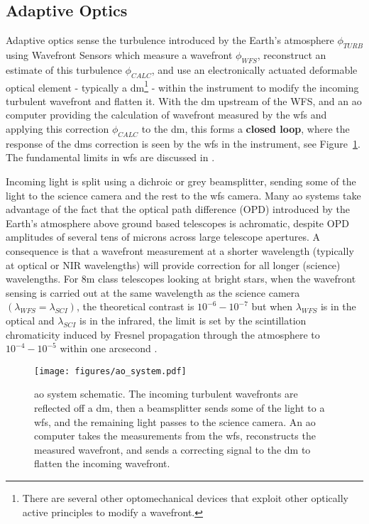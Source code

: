 \documentclass[letterpaper]{ar-1col}
\newcommand{\acc}[1]{\entry{\acs{#1}}{\acl{#1}}}
\begin{document}
\subsection{Adaptive Optics}

Adaptive optics sense the turbulence introduced by the Earth's atmosphere $\phi_{TURB}$ using Wavefront Sensors which measure a wavefront $\phi_{WFS}$, reconstruct an estimate of this turbulence $\phi_{CALC}$, and use an electronically actuated deformable optical element - typically a \ac{dm}\footnote{There are several other optomechanical devices that exploit other optically active principles to modify a wavefront.} - within the instrument to modify the incoming turbulent wavefront and flatten it.
%
With the \ac{dm} upstream of the WFS, and an \ac{ao} computer providing the calculation of wavefront measured by the \ac{wfs} and applying this correction $\phi_{CALC}$ to the \ac{dm}, this forms a {\bf closed loop}, where the response of the \acp{dm} correction is seen by the \ac{wfs} in the instrument, see Figure~\ref{fig:aosystem}.
%
The fundamental limits in \ac{wfs} are discussed in .

%
\begin{armarginnote}[]
\acc{dm}
\acc{fpm}
\acc{ppm}
\acc{wfs}
\acc{ao}
\end{armarginnote}

Incoming light is split using a dichroic or grey beamsplitter, sending some of the light to the science camera and the rest to the \ac{wfs} camera.
%
Many \ac{ao} systems take advantage of the fact that the optical path difference (OPD) introduced by the Earth's atmosphere above ground based telescopes is achromatic, despite OPD amplitudes of several tens of microns across large telescope apertures.
%
A consequence is that a wavefront measurement at a shorter wavelength (typically at optical or NIR wavelengths) will provide correction for all longer (science) wavelengths.
%
For 8m class telescopes looking at bright stars, when the wavefront sensing is carried out at the same wavelength as the science camera $(\lambda_{WFS}=\lambda_{SCI})$, the theoretical contrast is $10^{-6}-10^{-7}$ but when $\lambda_{WFS}$ is in the optical and $\lambda_{SCI}$ is in the infrared, the limit is set by the scintillation chromaticity induced by Fresnel propagation through the atmosphere to $10^{-4}-10^{-5}$ within one arcsecond \citep[see ][ for a discussion of this and the other limits to \ac{ao} for HCI]{Guyon05-1}.

\begin{figure}[!ht]
\centering
\texttt{[image: figures/ao\_system.pdf]}
 \caption{\ac{ao} system schematic. The incoming turbulent wavefronts are reflected off a \ac{dm}, then a beamsplitter sends some of the light to a \ac{wfs}, and the remaining light passes to the science camera. An \ac{ao} computer takes the measurements from the \ac{wfs}, reconstructs the measured wavefront, and sends a correcting signal to the \ac{dm} to flatten the incoming wavefront.}
  \label{fig:aosystem}
\end{figure}
\end{document}
